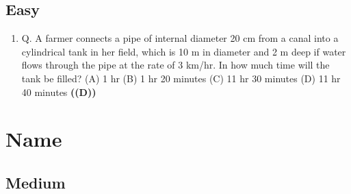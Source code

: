 \documentclass{article}
\begin{document}
\subsection{Easy}
\begin{enumerate}
\item Q. A farmer connects a pipe of internal diameter 20 cm from a canal into a cylindrical tank in her field, which is 10 m in diameter and 2 m deep if water flows through the pipe at the rate of 3 km/hr. In how much time will the tank be filled?
(A) 1 hr
(B) 1 hr 20 minutes
(C) 11 hr 30 minutes
(D) 11 hr 40 minutes \hfill \textbf{((D))}
\end{enumerate}
\section{Name}
\subsection{Medium}
\end{document}
